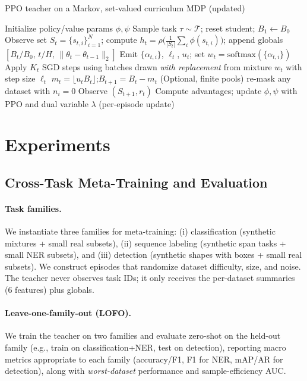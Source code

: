 \documentclass[11pt]{article}
\newcommand{\1}{\mathbf{1}}
\begin{document}
\begin{algorithm}[H]
\caption{PPO teacher on a Markov, set-valued curriculum MDP (updated)}
\label{alg:ppo}
\begin{algorithmic}[1]
\State Initialize policy/value params $\phi,\psi$
    \State Sample task $\tau\sim\mathcal{T}$; reset student; $B_1\leftarrow B_0$
      \State {}
      \State Observe set $S_t=\{s_{t,i}\}_{i=1}^N$; compute $h_t=\rho\!\big(\tfrac{1}{|S_t|}\sum_i \phi(s_{t,i})\big)$; append globals $[B_t/B_0,\,t/H,\,\|\theta_t-\theta_{t-1}\|_2]$
      \State Emit $\{\alpha_{t,i}\}$, $\ell_t$, $u_t$; set $w_t=\mathrm{softmax}(\{\alpha_{t,i}\})$
      \State Apply $K_t$ SGD steps using batches drawn \emph{with replacement} from mixture $w_t$ with step size $\ell_t$
      \State $m_t=\lfloor u_t B_t\rfloor$;\quad $B_{t+1}=B_t-m_t$
      \State (Optional, finite pools) re-mask any dataset with $n_i=0$
      \State Observe $(S_{t+1}, r_t)$
    \EndFor
  \EndFor
  \State Compute advantages; update $\phi,\psi$ with PPO and dual variable $\lambda$ (per-episode update)
\EndFor
\end{algorithmic}
\end{algorithm}


\section{Experiments}
\subsection{Cross-Task Meta-Training and Evaluation}
\paragraph{Task families.}
We instantiate three families for meta-training: (i) classification (synthetic mixtures + small real subsets), (ii) sequence labeling (synthetic span tasks + small NER subsets), and (iii) detection (synthetic shapes with boxes + small real subsets). 
We construct episodes that randomize dataset difficulty, size, and noise. 
The teacher never observes task IDs; it only receives the per-dataset summaries (6 features) plus globals.

\paragraph{Leave-one-family-out (LOFO).}
We train the teacher on two families and evaluate zero-shot on the held-out family (e.g., train on classification+NER, test on detection), reporting macro metrics appropriate to each family (accuracy/F1, F1 for NER, mAP/AR for detection), along with \emph{worst-dataset} performance and sample-efficiency AUC.
\end{document}
